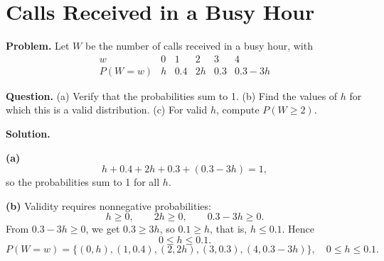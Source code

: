		\section{Calls Received in a Busy Hour}
		
		\textbf{Problem.}
		Let $W$ be the number of calls received in a busy hour, with
		\[
		\begin{array}{c|ccccc}
			w & 0 & 1 & 2 & 3 & 4\\
			\hline
			P(W=w) & h & 0.4 & 2h & 0.3 & 0.3-3h
		\end{array}
		\]
		
		\textbf{Question.}
		(a) Verify that the probabilities sum to 1.
		(b) Find the values of $h$ for which this is a valid distribution.
		(c) For valid $h$, compute $P(W\ge 2)$.
		
		\textbf{Solution.}
		
		\textbf{(a)}
		\[
		h+0.4+2h+0.3+(0.3-3h)=1,
		\]
		so the probabilities sum to 1 for all $h$.
		
		\textbf{(b)} Validity requires nonnegative probabilities:
		\[
		h\ge 0,\qquad 2h\ge 0,\qquad 0.3-3h\ge 0.
		\]
		From $0.3-3h\ge 0$, we get $0.3\ge 3h$, so $0.1\ge h$, that is, $h\le 0.1$. Hence
		\[
		0\le h\le 0.1.
		\]
		\[
		P(W=w)=\{(0,h),(1,0.4),(2,2h),(3,0.3),(4,0.3-3h)\},\quad 0\le h\le 0.1.
		\]
		\begin{center}
		\hspace{0.35cm}
		\end{center}
		
